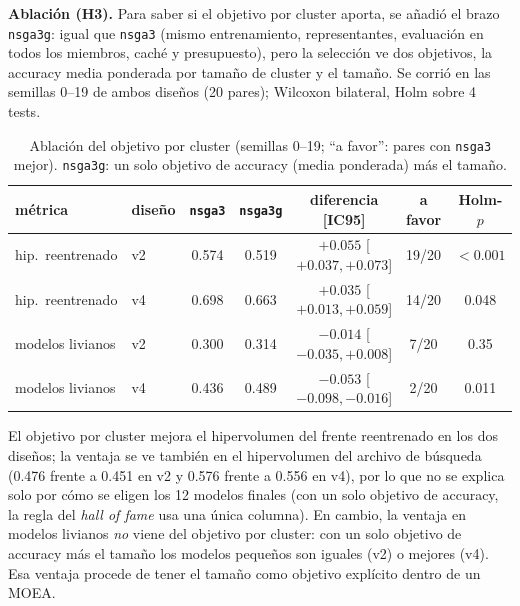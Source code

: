 \documentclass[11pt,a4paper]{article}
\begin{document}
\textbf{Ablación (H3).} Para saber si el objetivo por cluster aporta, se añadió el brazo \texttt{nsga3g}: igual que \texttt{nsga3} (mismo entrenamiento, representantes, evaluación en todos los miembros, caché y presupuesto), pero la selección ve dos objetivos, la accuracy media ponderada por tamaño de cluster y el tamaño. Se corrió en las semillas 0--19 de ambos diseños (20 pares); Wilcoxon bilateral, Holm sobre 4 tests.
\begin{table}[h]
\centering\small
\begin{tabular}{llccccc}
\toprule
métrica & diseño & \texttt{nsga3} & \texttt{nsga3g} & diferencia [IC95] & a favor & Holm-$p$\\
\midrule
hip.\ reentrenado & v2 & 0.574 & 0.519 & $+0.055$ [$+0.037,+0.073$] & 19/20 & $<0.001$\\
hip.\ reentrenado & v4 & 0.698 & 0.663 & $+0.035$ [$+0.013,+0.059$] & 14/20 & 0.048\\
modelos livianos & v2 & 0.300 & 0.314 & $-0.014$ [$-0.035,+0.008$] & 7/20 & 0.35\\
modelos livianos & v4 & 0.436 & 0.489 & $-0.053$ [$-0.098,-0.016$] & 2/20 & 0.011\\
\bottomrule
\end{tabular}
\caption{Ablación del objetivo por cluster (semillas 0--19; ``a favor'': pares con \texttt{nsga3} mejor). \texttt{nsga3g}: un solo objetivo de accuracy (media ponderada) más el tamaño.}
\label{tab:ablacion}
\end{table}
El objetivo por cluster mejora el hipervolumen del frente reentrenado en los dos diseños; la ventaja se ve también en el hipervolumen del archivo de búsqueda (0.476 frente a 0.451 en v2 y 0.576 frente a 0.556 en v4), por lo que no se explica solo por cómo se eligen los 12 modelos finales (con un solo objetivo de accuracy, la regla del \emph{hall of fame} usa una única columna). En cambio, la ventaja en modelos livianos \emph{no} viene del objetivo por cluster: con un solo objetivo de accuracy más el tamaño los modelos pequeños son iguales (v2) o mejores (v4). Esa ventaja procede de tener el tamaño como objetivo explícito dentro de un MOEA.
\end{document}
